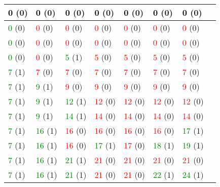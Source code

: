 \documentclass{article}
\begin{document}
\centering 
\begin{figure}[H]
\label{my-label2}
\begin{tabular}{|l|l|l|l|l|l|l|l|}
\hline
\textcolor{black}{0} (0)&\textcolor{black}{0} (0)&\textcolor{black}{0} (0)&\textcolor{black}{0} (0)&\textcolor{black}{0} (0)&\textcolor{black}{0} (0)&\textcolor{black}{0} (0)&\\ \hline
\textcolor{green}{0} (0)&\textcolor{red}{0} (0)&\textcolor{red}{0} (0)&\textcolor{red}{0} (0)&\textcolor{red}{0} (0)&\textcolor{red}{0} (0)&\textcolor{red}{0} (0)&\\ \hline
\textcolor{green}{0} (0)&\textcolor{red}{0} (0)&\textcolor{red}{0} (0)&\textcolor{red}{0} (0)&\textcolor{red}{0} (0)&\textcolor{red}{0} (0)&\textcolor{red}{0} (0)&\\ \hline
\textcolor{green}{0} (0)&\textcolor{red}{0} (0)&\textcolor{green}{5} (1)&\textcolor{red}{5} (0)&\textcolor{red}{5} (0)&\textcolor{red}{5} (0)&\textcolor{red}{5} (0)&\\ \hline
\textcolor{green}{7} (1)&\textcolor{red}{7} (0)&\textcolor{red}{7} (0)&\textcolor{red}{7} (0)&\textcolor{red}{7} (0)&\textcolor{red}{7} (0)&\textcolor{red}{7} (0)&\\ \hline
\textcolor{green}{7} (1)&\textcolor{green}{9} (1)&\textcolor{red}{9} (0)&\textcolor{red}{9} (0)&\textcolor{red}{9} (0)&\textcolor{red}{9} (0)&\textcolor{red}{9} (0)&\\ \hline
\textcolor{green}{7} (1)&\textcolor{green}{9} (1)&\textcolor{green}{12} (1)&\textcolor{red}{12} (0)&\textcolor{red}{12} (0)&\textcolor{red}{12} (0)&\textcolor{red}{12} (0)&\\ \hline
\textcolor{green}{7} (1)&\textcolor{green}{9} (1)&\textcolor{green}{14} (1)&\textcolor{red}{14} (0)&\textcolor{red}{14} (0)&\textcolor{red}{14} (0)&\textcolor{red}{14} (0)&\\ \hline
\textcolor{green}{7} (1)&\textcolor{green}{16} (1)&\textcolor{red}{16} (0)&\textcolor{red}{16} (0)&\textcolor{red}{16} (0)&\textcolor{red}{16} (0)&\textcolor{green}{17} (1)&\\ \hline
\textcolor{green}{7} (1)&\textcolor{green}{16} (1)&\textcolor{red}{16} (0)&\textcolor{green}{17} (1)&\textcolor{red}{17} (0)&\textcolor{green}{18} (1)&\textcolor{green}{19} (1)&\\ \hline
\textcolor{green}{7} (1)&\textcolor{green}{16} (1)&\textcolor{green}{21} (1)&\textcolor{red}{21} (0)&\textcolor{red}{21} (0)&\textcolor{red}{21} (0)&\textcolor{red}{21} (0)&\\ \hline
\textcolor{green}{7} (1)&\textcolor{green}{16} (1)&\textcolor{green}{21} (1)&\textcolor{red}{21} (0)&\textcolor{red}{21} (0)&\textcolor{green}{22} (1)&\textcolor{green}{24} (1)&\\ \hline

\end{tabular}
\end{figure}
\end{document}
